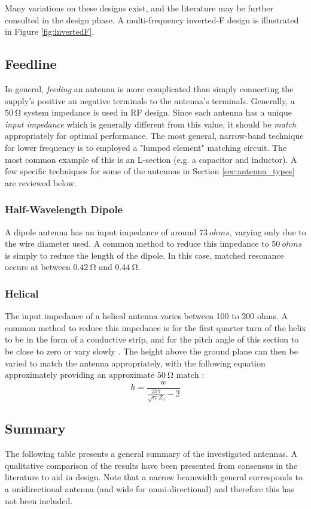 Many variations on these designs exist, and the literature may be further consulted in the design phase. A multi-frequency inverted-F design is illustrated in Figure \ref{fig:invertedF}.

\subsection{Feedline}
In general, \textit{feeding} an antenna is more complicated than simply connecting the supply's positive an negative terminals to the antenna's terminals. Generally, a $\SI{50}{\ohm}$ system impedance is used in RF design. Since each antenna has a unique \textit{input impedance} which is generally different from this value, it should be \textit{match} appropriately for optimal performance. The most general, narrow-band technique for lower frequency is to employed a "lumped element" matching circuit. The most common example of this is an L-section (e.g. a capacitor and inductor). A few specific techniques for some of the antennas in Section \ref{sec:antenna_types} are reviewed below.

\subsubsection{Half-Wavelength Dipole}
A dipole antenna has an input impedance of around $\SI{73}{ohms}$, varying only due to the wire diameter used. A common method to reduce this impedance to $\SI{50}{ohms}$ is simply to reduce the length of the dipole. In this case, matched resonance occurs at between $\SI{0.42}{\ohm}$ and $\SI{0.44}{\ohm}$. \cite{textbook-antennaTheoryAnalysisDesign}

\subsubsection{Helical}\label{sec:helical_matching}
The input impedance of a helical antenna varies between 100 to 200 ohms. A common method to reduce this impedance is for the first quarter turn of the helix to be in the form of a conductive strip, and for the pitch angle of this section to be close to zero or vary slowly \cite{textbook-antennaTheoryAnalysisDesign}. The height above the ground plane can then be varied to match the antenna appropriately, with the following equation approximately providing an approximate $\SI{50}{\ohm}$ match \cite{textbook-antennaTheoryAnalysisDesign}:
$$h = \frac{w}{\frac{377}{\sqrt{\epsilon_r} Z_0} - 2}$$

\subsection{Summary}
The following table presents a general summary of the investigated antennas. A qualitative comparison of the results have been presented from consensus in the literature to aid in design. Note that a narrow beamwidth general corresponds to a unidirectional antenna (and wide for omni-directional) and therefore this has not been included.

